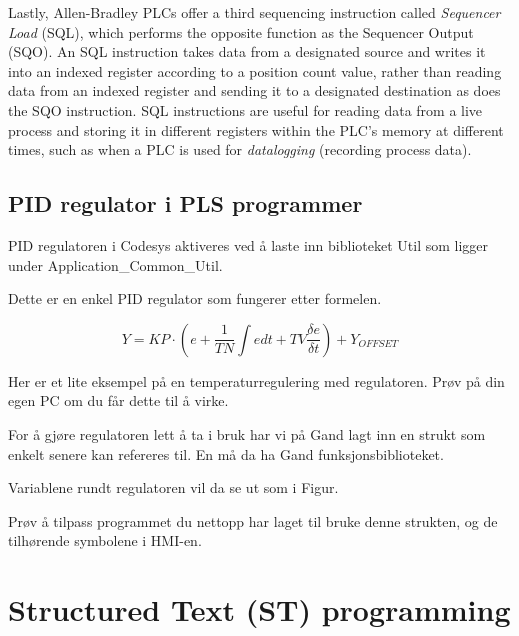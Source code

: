\vskip 10pt

\filbreak

Lastly, Allen-Bradley PLCs offer a third sequencing instruction called \textit{Sequencer Load} (SQL), which performs the opposite function as the Sequencer Output (SQO).  An SQL instruction takes data from a designated source and writes it into an indexed register according to a position count value, rather than reading data from an indexed register and sending it to a designated destination as does the SQO instruction.  SQL instructions are useful for reading data from a live process and storing it in different registers within the PLC's memory at different times, such as when a PLC is used for \textit{datalogging} (recording process data).    


\subsection{PID regulator i PLS programmer}


PID regulatoren i Codesys aktiveres ved å laste inn biblioteket Util
som ligger under Application\_Common\_Util. 

Dette er en enkel PID regulator som fungerer etter formelen. 

\[
\ensuremath{Y=KP\cdot(e+\frac{1}{TN}\int edt+TV\frac{\delta e}{\delta t})+Y_{OFFSET}}
\]


Her er et lite eksempel på en temperaturregulering med regulatoren.
Prøv på din egen PC om du får dette til å virke. 


For å gjøre regulatoren lett å ta i bruk har vi på Gand lagt inn en
strukt som enkelt senere kan refereres til. En må da ha Gand funksjonsbiblioteket. 

Variablene rundt regulatoren vil da se ut som i Figur.




Prøv å tilpass programmet du nettopp har laget til bruke denne strukten,
og de tilhørende symbolene i HMI-en. 







\filbreak
\section{Structured Text (ST) programming}

